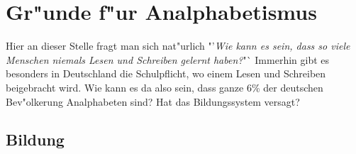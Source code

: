 \section{Gr"unde f"ur Analphabetismus} \label{sec:reasons}

Hier an dieser Stelle fragt man sich nat"urlich "'\textit{Wie kann es sein, dass so viele Menschen niemals Lesen und Schreiben gelernt haben?}"` Immerhin gibt es besonders in Deutschland die Schulpflicht, wo einem Lesen und Schreiben beigebracht wird. Wie kann es da also sein, dass ganze 6\% der deutschen Bev"olkerung Analphabeten sind? Hat das Bildungssystem versagt? \\


\subsection{Bildung}

